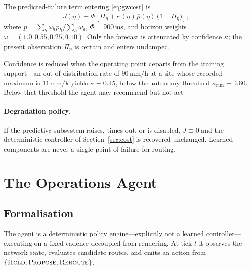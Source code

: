 \documentclass[10pt,twocolumn]{article}
\newcommand{\ms}{\,\mathrm{ms}}
\newcommand{\mmh}{\,\mathrm{mm/h}}
\begin{document}
The predicted-failure term entering \eqref{eq:gwcost} is
\begin{equation}
J(\eta)=\Phi\left[\Pi_{\eta}
+ \kappa(\eta)\,\bar{p}(\eta)\,\big(1-\Pi_{\eta}\big)\right],
\label{eq:predcost}
\end{equation}
where $\bar{p}=\sum_{h}\omega_{h}p_{h}\big/\sum_{h}\omega_{h}$,
$\Phi=900\ms$, and horizon weights
$\omega=(1.0,0.55,0.25,0.10)$. Only the forecast is attenuated by confidence
$\kappa$; the present observation $\Pi_{\eta}$ is certain and enters undamped.

Confidence is reduced when the operating point departs from the training
support---an out-of-distribution rate of $90\mmh$ at a site whose recorded
maximum is $11\mmh$ yields $\kappa=0.45$, below the autonomy threshold
$\kappa_{\min}=0.60$. Below that threshold the agent may recommend but not act.

\paragraph{Degradation policy.} If the predictive subsystem raises, times out, or
is disabled, $J\equiv0$ and the deterministic controller of
Section~\ref{sec:cost} is recovered unchanged. Learned components are never a
single point of failure for routing.

\section{The Operations Agent}
\label{sec:agent}

\subsection{Formalisation}

The agent is a deterministic policy engine---explicitly not a learned
controller---executing on a fixed cadence decoupled from rendering. At tick $t$
it observes the network state, evaluates candidate routes, and emits an action
from $\{\textsc{Hold},\textsc{Propose},\textsc{Reroute}\}$.
\end{document}
